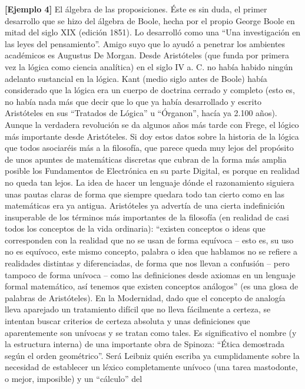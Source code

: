 \begin{enumerate}
  \textbf{{[}Ejemplo 4{]}} El álgebra de las proposiciones. Éste es sin
  duda, el primer desarrollo que se hizo del álgebra de Boole, hecha por
  el propio George Boole en mitad del siglo XIX (edición 1851). Lo
  desarrolló como una ``Una investigación en las leyes del
  pensamiento''. Amigo suyo que lo ayudó a penetrar los ambientes
  académi\-cos es Augustus De Morgan. Desde Aristóteles (que funda por
  primera vez la ló\-gica como ciencia analítica) en el siglo IV a. C.
  no había habido ningún adelanto sustancial en la lógica. Kant (medio
  siglo antes de Boole) había considerado que la lógica era un cuerpo de
  doctrina cerrado y completo (esto es, no había nada más que decir que
  lo que ya había desarrollado y escrito Aristóteles en sus ``Tra\-tados
  de Lógica'' u ``Órganon'', hacía ya 2.100 años). Aunque la verdadera
  revolu\-ción se da algunos años más tarde con Frege, el lógico más
  importante desde Aristóteles. Si doy estos datos sobre la historia de
  la lógica que todos asociaréis más a la filosofía, que parece queda
  muy lejos del propósito de unos apuntes de matemáticas discretas que
  cubran de la forma más amplia posible los Fundamentos de Electrónica
  en su parte Digital, es porque en realidad no queda tan lejos. La idea
  de hacer un lenguaje dónde el razonamiento siguiera unas pautas claras
  de forma que siempre quedara todo tan cierto como en las matemáticas
  era ya antigua. Aristóteles ya advertía de una cierta indefinición
  insuperable de los términos más importantes de la filosofía (en
  realidad de casi todos los conceptos de la vida ordinaria): ``existen
  conceptos o ideas que corresponden con la realidad que no se usan de
  forma equívoca -- esto es, su uso no es equívoco, este mismo concepto,
  palabra o idea que hablamos no se refiere a realidades distintas y
  diferenciadas, de forma que nos llevan a confusión -- pero tampoco de
  forma unívoca -- como las definiciones desde axiomas en un lenguaje
  formal matemático, así tenemos que existen conceptos análogos'' (es
  una glosa de palabras de Aristóteles). En la Modernidad, dado que el
  concepto de analogía lleva aparejado un tratamiento difícil que no
  lleva fácilmente a certeza, se intentan buscar criterios de certeza
  absoluta y unas definiciones que aparentemente son unívocas y se
  tratan como tales. Es significativo el nombre (y la estructura
  interna) de una importante obra de Spino\-za: ``Ética demostrada según
  el orden geométrico''. Será Leibniz quién escriba ya cumplidamente
  sobre la necesidad de establecer un léxico completamente unívoco (una
  tarea mastodonte, o mejor, imposible) y un ``cálculo'' del

\end{enumerate}
